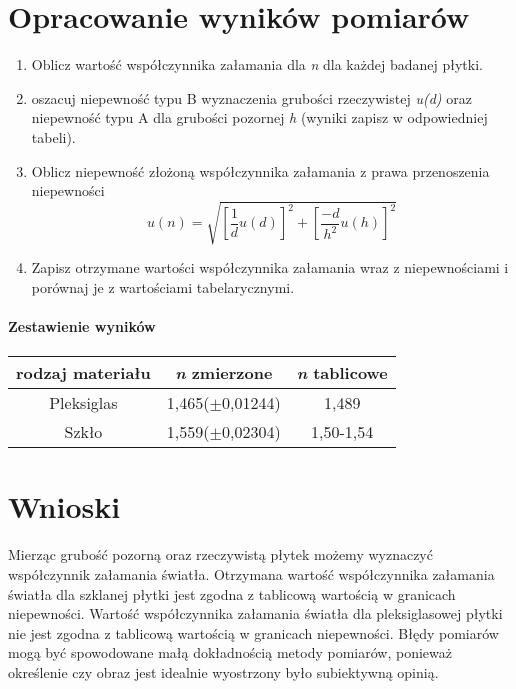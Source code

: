 \documentclass[a4paper,10pt,twoside]{article}
\begin{document}
	\section{Opracowanie wyników pomiarów}
	\begin{enumerate}
		\item Oblicz wartość współczynnika załamania dla \textit{n} dla każdej badanej płytki.
		\item oszacuj niepewność typu B wyznaczenia grubości rzeczywistej \textit{u(d)} oraz niepewność typu A dla grubości pozornej \textit{h} (wyniki zapisz w odpowiedniej tabeli).
		\item Oblicz niepewność złożoną współczynnika załamania z prawa przenoszenia niepewności $$  u(n) = \sqrt{\left[\frac{1}{d}u(d)\right]^2 + \left[ \frac{-d}{h^2}u(h)\right]^2}$$
		\item Zapisz otrzymane wartości współczynnika załamania wraz z niepewnościami i porównaj je z wartościami tabelarycznymi. 
 	\end{enumerate}
 \paragraph{Zestawienie wyników} 
 \paragraph{}
 \begin{center}
 
 	\begin{tabular}[b]{|c|c|c|}
 		\hline
 		rodzaj materiału & \textit{n} zmierzone & \textit{n} tablicowe \\ \hline
 		Pleksiglas & 1,465($\pm$0,01244) & 1,489\\ \hline
 		Szkło & 1,559($\pm$0,02304)&1,50-1,54 \\ \hline
 	\end{tabular}
\end{center}
	\noindent
	
	
	\section{Wnioski}

	Mierząc grubość pozorną oraz rzeczywistą płytek możemy wyznaczyć współczynnik załamania światła. Otrzymana wartość współczynnika załamania światła dla szklanej płytki jest zgodna z tablicową wartością w granicach niepewności. Wartość współczynnika załamania światła dla pleksiglasowej płytki nie jest zgodna z tablicową wartością w granicach niepewności. Błędy pomiarów mogą być spowodowane małą dokładnością metody pomiarów, ponieważ określenie czy obraz jest idealnie wyostrzony było subiektywną opinią.  
\end{document}
